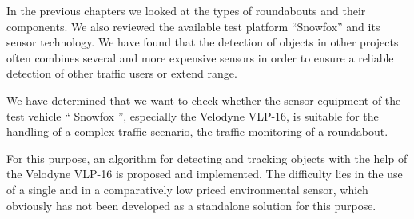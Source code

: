 \documentclass[11pt,oneside,openright]{mpreport}
\begin{document}


In the previous chapters we looked at the types of roundabouts and their components. We also reviewed the available test platform ``Snowfox'' and its sensor technology.
We have found that the detection of objects in other projects often combines several and more expensive sensors in order to ensure a reliable detection of other traffic users or
extend range.


We have determined that we want to check whether the sensor equipment of the test vehicle `` Snowfox '', especially the Velodyne VLP-16, is suitable for the 
handling of a complex traffic scenario, the traffic monitoring of a roundabout.


For this purpose, an algorithm for detecting and tracking objects with the help of the Velodyne VLP-16 is proposed and implemented. 
The difficulty lies in the use of a single and in a comparatively low priced environmental sensor, which obviously has not been developed as a standalone solution for this purpose.
\end{document}
